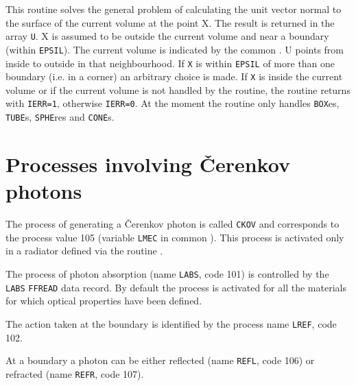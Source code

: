 This routine solves the general problem of calculating the unit vector
normal to the surface of the current volume at the point X. The result
is returned in the array {\tt U}. X is assumed to be outside the current
volume and near a boundary
(within {\tt EPSIL}). The current volume is indicated by the common
.  U points from inside to outside in that
neighbourhood. If {\tt X} is within {\tt EPSIL} of more than one boundary
(i.e. in a corner) an arbitrary choice is made.
If {\tt X} is inside the current volume
or if the current volume is not handled by the routine,
the routine returns with
{\tt IERR=1}, otherwise {\tt IERR=0}. At the moment the routine only
handles {\tt BOX}es, {\tt TUBE}s, {\tt SPHE}res and {\tt CONE}s.

\section{Processes involving \v{C}erenkov photons}

The process of generating a \v{C}erenkov photon is called {\tt CKOV}
and corresponds to the process value 105 (variable {\tt LMEC} in
common ).
This process is activated only in a radiator defined via the routine
.

The process of photon absorption (name {\tt LABS}, code 101) is controlled
by the {\tt LABS} {\tt FFREAD} data record. By default the process is
activated for all the materials for which optical properties have been
defined.

The action taken at the boundary is identified by the process name {\tt LREF},
code 102.

At a boundary a photon can be either reflected (name {\tt REFL}, code 106)
or refracted (name {\tt REFR}, code 107).

